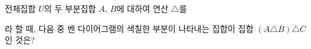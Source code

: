 전체집합 $U$의 두 부분집합 $A$, $B$에 대하여 연산 $\triangle$를\par\smallskip{}\par\smallskip\noindent 라 할 때, 다음 중 벤 다이어그램의 색칠한 부분이 나타내는 집합이 집합 $(A\triangle B)\triangle C$인 것은?
\begin{choicesii}{}{}{}{}{}\end{choicesii}
